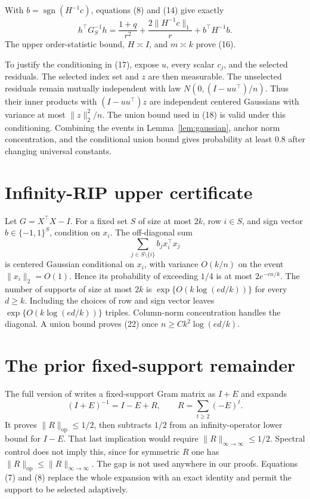 \documentclass[twoside]{article}
\newcommand{\sgn}{\operatorname{sgn}}
\begin{document}
With $b=\sgn(H^{-1}c)$, equations (8) and (14) give exactly
\[
 h^\top G_S^{-1}h
 =\frac{1+q}{r^2}+\frac{2\|H^{-1}c\|_1}{r}
   +b^\top H^{-1}b.
\]
The upper order-statistic bound, $H\asymp I$, and $m\asymp k$ prove (16).

To justify the conditioning in (17), expose $u$, every scalar $c_j$, and the
selected residuals. The selected index set and $z$ are then measurable. The
unselected residuals remain mutually independent with law
$N(0,(I-uu^\top)/n)$. Thus their inner products with
$(I-uu^\top)z$ are independent centered Gaussians with variance at most
$\|z\|_2^2/n$. The union bound used in (18) is valid under this conditioning.
Combining the events in Lemma~\ref{lem:gaussian}, anchor norm concentration,
and the conditional union bound gives probability at least $0.8$ after changing
universal constants.

\section{Infinity-RIP upper certificate}
\label{app:upper}

Let $G=X^\top X-I$. For a fixed set $S$ of size at most $2k$, row $i\in S$,
and sign vector $b\in\{-1,1\}^S$, condition on $x_i$. The off-diagonal sum
\[
 \sum_{j\in S\setminus\{i\}}b_jx_i^\top x_j
\]
is centered Gaussian conditional on $x_i$, with variance
$O(k/n)$ on the event $\|x_i\|_2=O(1)$. Hence its probability of exceeding
$1/4$ is at most $2e^{-cn/k}$. The number of supports of size at most $2k$ is
$\exp\{O(k\log(ed/k))\}$ for every $d\geq k$. Including the choices of row and
sign vector leaves $\exp\{O(k\log(ed/k))\}$ triples. Column-norm concentration
handles the diagonal. A union bound proves (22) once
$n\geq Ck^2\log(ed/k)$.

\section{The prior fixed-support remainder}
\label{app:prior}

The full version of \citet{chen2026adaptive} writes a fixed-support Gram matrix
as $I+E$ and expands
\[
 (I+E)^{-1}=I-E+R,
 \qquad R=\sum_{t\geq2}(-E)^t.
\]
It proves $\|R\|_{\mathrm{op}}\leq1/2$, then subtracts $1/2$ from an
infinity-operator lower bound for $I-E$. That last implication would require
$\|R\|_{\infty\to\infty}\leq1/2$. Spectral control does not imply this, since
for symmetric $R$ one has
$\|R\|_{\mathrm{op}}\leq\|R\|_{\infty\to\infty}$. The gap is not used anywhere
in our proofs. Equations (7) and (8) replace the whole expansion with an exact
identity and permit the support to be selected adaptively.
\end{document}
